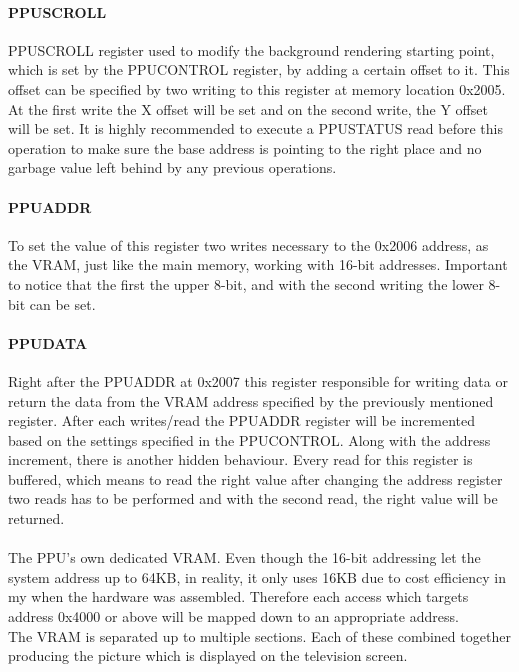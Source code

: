 \documentclass[]{report}
\begin{document}
\paragraph{PPUSCROLL}
PPUSCROLL register used to modify the background rendering starting point, which is set by the PPUCONTROL register, by adding a certain offset to it. This offset can be specified by two writing to this register at memory location 0x2005. At the first write the X offset will be set and on the second write, the Y offset will be set. It is highly recommended to execute a PPUSTATUS read before this operation to make sure the base address is pointing to the right place and no garbage value left behind by any previous operations.

\paragraph{PPUADDR}
To set the value of this register two writes necessary to the 0x2006 address, as the VRAM, just like the main memory, working with 16-bit addresses. Important to notice that the first the upper 8-bit, and with the second writing the lower 8-bit can be set.

\paragraph{PPUDATA}
Right after the PPUADDR at 0x2007 this register responsible for writing data or return the data from the VRAM address specified by the previously mentioned register. After each writes/read the PPUADDR register will be incremented based on the settings specified in the PPUCONTROL. Along with the address increment, there is another hidden behaviour. Every read for this register is buffered, which means to read the right value after changing the address register two reads has to be performed and with the second read, the right value will be returned.

\paragraph{ } 
The PPU's own dedicated VRAM. Even though the 16-bit addressing let the system address up to 64KB,  in reality, it only uses 16KB due to cost efficiency in my when the hardware was assembled.
Therefore each access which targets address 0x4000 or above will be mapped down to an appropriate address.
\\
The VRAM is separated up to multiple sections. Each of these combined together producing the picture which is displayed on the television screen.
\end{document}
